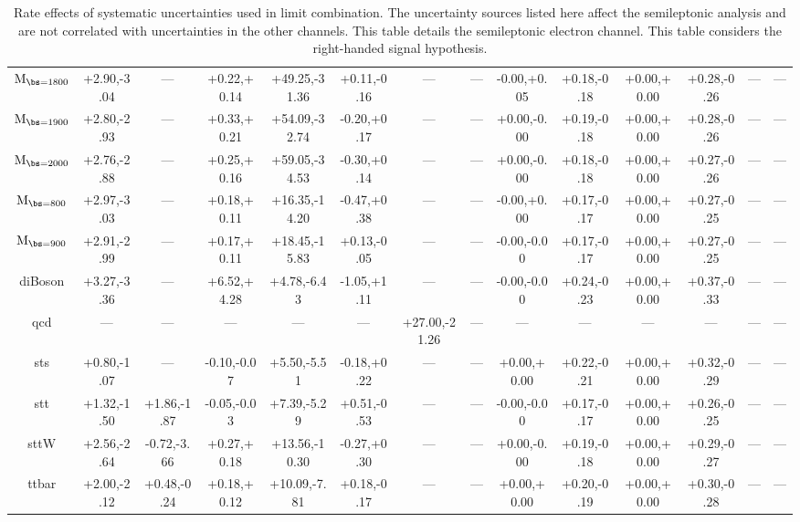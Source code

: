 \begin{table}
\begin{center}
\begin{small}
{\begin{tabular}{c||c|c|c|c|c|c|c|c|c|c|c|c|c}
$\mathrm{M_{\bs=1800}}$ & +2.90,-3.04 & --- & +0.22,+0.14 & +49.25,-31.36 & +0.11,-0.16 & --- & --- & -0.00,+0.05 & +0.18,-0.18 & +0.00,+0.00 & +0.28,-0.26 & --- & --- \\ 
$\mathrm{M_{\bs=1900}}$ & +2.80,-2.93 & --- & +0.33,+0.21 & +54.09,-32.74 & -0.20,+0.17 & --- & --- & +0.00,-0.00 & +0.19,-0.18 & +0.00,+0.00 & +0.28,-0.26 & --- & --- \\ 
$\mathrm{M_{\bs=2000}}$ & +2.76,-2.88 & --- & +0.25,+0.16 & +59.05,-34.53 & -0.30,+0.14 & --- & --- & +0.00,-0.00 & +0.18,-0.18 & +0.00,+0.00 & +0.27,-0.26 & --- & --- \\ 
$\mathrm{M_{\bs=800}}$ & +2.97,-3.03 & --- & +0.18,+0.11 & +16.35,-14.20 & -0.47,+0.38 & --- & --- & -0.00,+0.00 & +0.17,-0.17 & +0.00,+0.00 & +0.27,-0.25 & --- & --- \\ 
$\mathrm{M_{\bs=900}}$ & +2.91,-2.99 & --- & +0.17,+0.11 & +18.45,-15.83 & +0.13,-0.05 & --- & --- & -0.00,-0.00 & +0.17,-0.17 & +0.00,+0.00 & +0.27,-0.25 & --- & --- \\ 
diBoson & +3.27,-3.36 & --- & +6.52,+4.28 & +4.78,-6.43 & -1.05,+1.11 & --- & --- & -0.00,-0.00 & +0.24,-0.23 & +0.00,+0.00 & +0.37,-0.33 & --- & --- \\ 
qcd & --- & --- & --- & --- & --- & +27.00,-21.26 & --- & --- & --- & --- & --- & --- & --- \\ 
sts & +0.80,-1.07 & --- & -0.10,-0.07 & +5.50,-5.51 & -0.18,+0.22 & --- & --- & +0.00,+0.00 & +0.22,-0.21 & +0.00,+0.00 & +0.32,-0.29 & --- & --- \\ 
stt & +1.32,-1.50 & +1.86,-1.87 & -0.05,-0.03 & +7.39,-5.29 & +0.51,-0.53 & --- & --- & -0.00,-0.00 & +0.17,-0.17 & +0.00,+0.00 & +0.26,-0.25 & --- & --- \\ 
sttW & +2.56,-2.64 & -0.72,-3.66 & +0.27,+0.18 & +13.56,-10.30 & -0.27,+0.30 & --- & --- & +0.00,-0.00 & +0.19,-0.18 & +0.00,+0.00 & +0.29,-0.27 & --- & --- \\ 
ttbar & +2.00,-2.12 & +0.48,-0.24 & +0.18,+0.12 & +10.09,-7.81 & +0.18,-0.17 & --- & --- & +0.00,+0.00 & +0.20,-0.19 & +0.00,+0.00 & +0.30,-0.28 & --- & --- \\ 
\hline
\end{tabular}
}
\caption{Rate effects of systematic uncertainties used in limit combination.  The uncertainty sources listed here affect the semileptonic analysis and are not correlated with uncertainties in the other channels.  
This table details the semileptonic electron channel.  This table considers the right-handed signal hypothesis.}
\label{table:bsRsysSl1}

\end{small}
\end{center}
\end{table}




